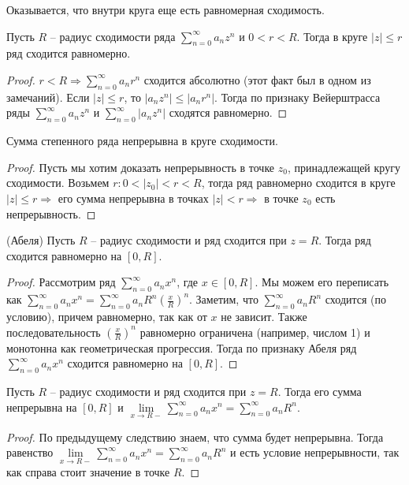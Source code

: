 \vspace*{10mm}
Оказывается, что внутри круга еще есть равномерная сходимость.

\begin{theorem}
    Пусть $R$ -- радиус сходимости ряда $\sum\limits_{n=0}^\infty a_nz^n$ и $0 < r < R$. 
    Тогда в круге $|z| \leqslant r$ ряд сходится равномерно.
\end{theorem}
\begin{proof}
    $r < R \Rightarrow \sum\limits_{n=0}^\infty a_nr^n$ сходится абсолютно (этот факт был в одном из замечаний).
    Если $|z| \leqslant r$, то $|a_nz^n| \leqslant |a_nr^n|$. 
    Тогда по признаку Вейерштрасса ряды $\sum\limits_{n=0}^\infty a_nz^n$ и $\sum\limits_{n=0}^\infty |a_nz^n|$ сходятся равномерно.
\end{proof}
\begin{follow}
    Сумма степенного ряда непрерывна в круге сходимости.
\end{follow}
\begin{proof}
    Пусть мы хотим доказать непрерывность в точке $z_0$, принадлежащей кругу сходимости.
    Возьмем $r: 0 < |z_0| < r < R$, тогда ряд равномерно сходится в круге $|z| \leqslant r \Rightarrow$ его сумма непрерывна в точках $|z| < r \Rightarrow$ в точке $z_0$ есть непрерывность.
\end{proof}

\begin{theorem} (Абеля) \;
    Пусть $R$ -- радиус сходимости и ряд сходится при $z = R$. 
    Тогда ряд сходится равномерно на $[0, R]$.
\end{theorem}
\begin{proof}
    Рассмотрим ряд $\sum\limits_{n = 0}^\infty a_n x^n$, где $x \in [0, R]$.
    Мы можем его переписать как $\sum\limits_{n = 0}^\infty a_n x^n = \sum\limits_{n = 0}^\infty a_n R^n (\frac{x}{R})^n$. 
    Заметим, что $\sum\limits_{n = 0}^\infty a_n R^n$ сходится (по условию), причем равномерно, так как от $x$ не зависит. 
    Также последовательность $(\frac{x}{R})^n$ равномерно ограничена (например, числом 1) и монотонна как геометрическая прогрессия. 
    Тогда по признаку Абеля ряд $\sum\limits_{n = 0}^\infty a_n x^n$ сходится равномерно на $[0, R]$.
\end{proof}

\begin{follow}
    Пусть $R$ -- радиус сходимости и ряд сходится при $z = R$. 
    Тогда его сумма непрерывна на $[0, R]$ и $\lim\limits_{x \to R-} \sum\limits_{n=0}^\infty a_nx^n = \sum\limits_{n=0}^\infty a_nR^n$.
\end{follow}
\begin{proof}
    По предыдущему следствию знаем, что сумма будет непрерывна. 
    Тогда равенство $\lim\limits_{x \to R-} \sum\limits_{n=0}^\infty a_nx^n = \sum\limits_{n=0}^\infty a_nR^n$ и есть условие непрерывности, так как справа стоит значение в точке $R$.
\end{proof}

